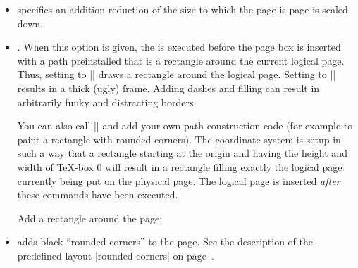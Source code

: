 \begin{command}{\pgfsetuppage{}}
\begin{itemize}
    \example Let logical page 2 show what logical page 1 showed on the
    just-shipped-out physical page:
\begin{codeexample}
\end{codeexample}
  \item
    specifies an addition reduction of the size to which the page is
    page is scaled down.
  \item
    .
    When this option is given, the  is executed before the
    page box is inserted with a path preinstalled that is a rectangle
    around the current logical page. Thus, setting  to
    |\pgfstroke| draws a rectangle around the logical page. Setting
     to |\pgfsetlinewidth{3pt}\pgfstroke| results in a
    thick (ugly) frame. Adding dashes and filling can result in
    arbitrarily funky and distracting borders.

    You can also call |\pgfdiscardpath| and add your own path
    construction code (for example to paint a rectangle with rounded
    corners). The coordinate system is  setup in such a way that a
    rectangle starting at the origin and having the height and width
    of \TeX-box 0 will result in a rectangle filling exactly the
    logical page currently being put on the physical page. The logical
    page is inserted \emph{after} these commands have been executed.

    \example Add a rectangle around the page:
\begin{codeexample}
\end{codeexample}
  \item
    adds black ``rounded corners'' to the page. See the description of
    the predefined layout |rounded corners| on
    page~\pageref{layout-rounded-corners}. 
  \end{itemize}
\end{command}

